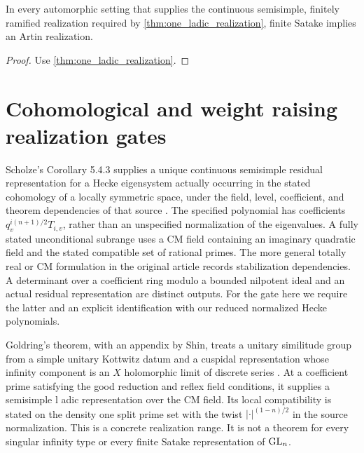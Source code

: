\begin{corollary}\label{cor:existing_realization_ranges}
In every automorphic setting that supplies the continuous semisimple, finitely ramified realization required by \cref{thm:one_ladic_realization}, finite Satake implies an Artin realization.
\end{corollary}

\begin{proof}
Use \cref{thm:one_ladic_realization}.
\end{proof}

\section{Cohomological and weight raising realization gates}\label{sec:cohomological_gates}

\begin{standardfact}\label{fact:scholze_torsion}
Scholze's Corollary 5.4.3 supplies a unique continuous semisimple residual representation for a Hecke eigensystem actually occurring in the stated cohomology of a locally symmetric space, under the field, level, coefficient, and theorem dependencies of that source \cite{Scholze2015}. The specified polynomial has coefficients \(q_v^{i(n+1)/2}T_{i,v}\), rather than an unspecified normalization of the eigenvalues. A fully stated unconditional subrange uses a CM field containing an imaginary quadratic field and the stated compatible set of rational primes. The more general totally real or CM formulation in the original article records stabilization dependencies. A determinant over a coefficient ring modulo a bounded nilpotent ideal and an actual residual representation are distinct outputs. For the gate here we require the latter and an explicit identification with our reduced normalized Hecke polynomials.
\end{standardfact}

\begin{standardfact}\label{fact:goldring_shin}
Goldring's theorem, with an appendix by Shin, treats a unitary similitude group from a simple unitary Kottwitz datum and a cuspidal representation whose infinity component is an \(X\) holomorphic limit of discrete series \cite{GoldringShin2014}. At a coefficient prime satisfying the good reduction and reflex field conditions, it supplies a semisimple l adic representation over the CM field. Its local compatibility is stated on the density one split prime set with the twist \(\lvert\cdot\rvert^{(1-n)/2}\) in the source normalization. This is a concrete realization range. It is not a theorem for every singular infinity type or every finite Satake representation of \(\operatorname{GL}_n\).
\end{standardfact}

